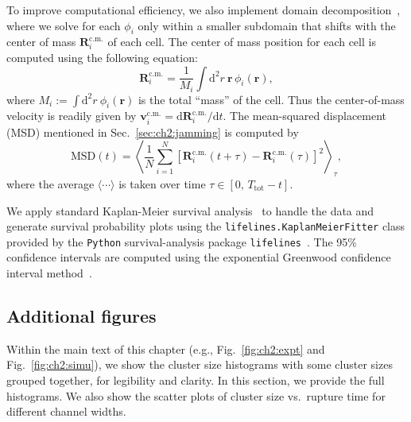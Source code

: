 To improve computational efficiency, we also implement domain decomposition~\cite{loewe2020solid, camley2014polarity, shao2010computational, nonomura2012study}, where we solve for each $\phi_i$ only within a smaller subdomain that shifts with the center of mass $\mathbf{R}_i^{\textrm{c.m.}}$ of each cell.
The center of mass position for each cell is computed using the following equation:
\begin{equation}
    \mathbf{R}_i^\text{c.m.}=\frac{1}{M_i}\int\mathrm{d}^2r~\mathbf{r}\,\phi_i(\mathbf{r}),
\end{equation}
where $M_i:=\int\mathrm{d}^2r~\phi_i(\mathbf{r})$ is the total ``mass'' of the cell.
Thus the center-of-mass velocity is readily given by $\mathbf{v}_i^\text{c.m.}=\mathrm{d}\mathbf{R}_i^\text{c.m.}/\mathrm{d} t$.
The mean-squared displacement (MSD) mentioned in Sec.~\ref{sec:ch2:jamming} is computed by~\cite{loewe2020solid}
\begin{equation}
    \mathrm{MSD}(t)=\left\langle\frac{1}{N}\sum_{i=1}^N\left[\mathbf{R}_i^{\text{c.m.}}(t+\tau)-\mathbf{R}_i^{\text{c.m.}}(\tau)\right]^2\right\rangle_\tau,
\end{equation}
where the average $\langle\cdots\rangle$ is taken over time $\tau\in[0,\,T_{\text{tot}}-t]$.

We apply standard Kaplan-Meier survival analysis~\cite{kaplan1958nonparametric} to handle the data and generate survival probability plots using the \texttt{lifelines.KaplanMeierFitter} class provided by the \texttt{Python} survival-analysis package \texttt{lifelines}~\cite{davidsonpilon2019lifelines}.
The 95\% confidence intervals are computed using the exponential Greenwood confidence interval method~\cite{greenwood1926natural}.


\subsection{Additional figures}
\label{sec:ch2:extra-figs}

Within the main text of this chapter (e.g., Fig.~\ref{fig:ch2:expt} and Fig.~\ref{fig:ch2:simu}), we show the cluster size histograms with some cluster sizes grouped together, for legibility and clarity.
In this section, we provide the full histograms.
We also show the scatter plots of cluster size vs.\ rupture time for different channel widths.

